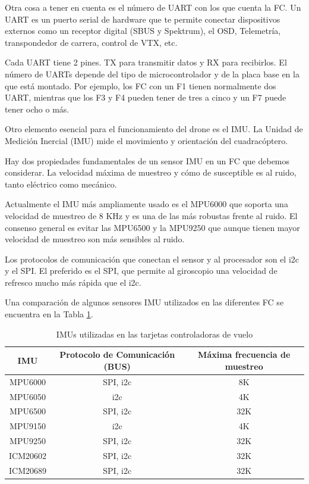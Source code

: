 \documentclass[pdflatex,sn-mathphys-num]{sn-jnl}%
\begin{document}
Otra cosa a tener en cuenta es el número de UART con los que cuenta la FC. Un UART es un puerto serial de hardware que te permite conectar dispositivos externos como un receptor digital (SBUS y Spektrum), el OSD, Telemetría, transpondedor de carrera, control de VTX, etc.

Cada UART tiene 2 pines. TX para transmitir datos y RX para recibirlos. El número de UARTs depende del tipo de microcontrolador y de la placa base en la que está montado. Por ejemplo, los FC con un F1 tienen normalmente dos UART, mientras que los F3 y F4 pueden tener de tres a cinco y un F7 puede tener ocho o más.

Otro elemento esencial para el funcionamiento del drone es el IMU. La Unidad de Medición Inercial (IMU) mide el movimiento y orientación del cuadracóptero.

Hay dos propiedades fundamentales de un sensor IMU en un FC que debemos considerar. La velocidad máxima de muestreo y cómo de susceptible es al ruido, tanto eléctrico como mecánico.

Actualmente el IMU más ampliamente usado es el MPU6000 que soporta una velocidad de muestreo de 8 KHz y es una de las más robustas frente al ruido. El consenso general es evitar las MPU6500 y la MPU9250 que aunque tienen mayor velocidad de muestreo son más sensibles al ruido.

Los protocolos de comunicación que conectan el sensor y al procesador son el i2c y el SPI. El preferido es el SPI, que permite al giroscopio una velocidad de refresco mucho más rápida que el i2c.

Una comparación de algunos sensores IMU utilizados en las diferentes FC se encuentra en la Tabla \ref{tab:imu_comparison}.

\begin{table}[!h]
\centering
\caption{IMUs utilizadas en las tarjetas controladoras de vuelo}
\label{tab:imu_comparison}
\begin{tabular}{|c|c|c|}
\hline
\textbf{IMU} & \textbf{Protocolo de Comunicación (BUS)} & \textbf{Máxima frecuencia de muestreo} \\
\hline
MPU6000 & SPI, i2c & 8K \\
\hline
MPU6050 & i2c & 4K \\
\hline
MPU6500 & SPI, i2c & 32K \\
\hline
MPU9150 & i2c & 4K \\
\hline
MPU9250 & SPI, i2c & 32K \\
\hline
ICM20602 & SPI, i2c & 32K \\
\hline
ICM20689 & SPI, i2c & 32K \\
\hline
\end{tabular}
\end{table}
\end{document}
